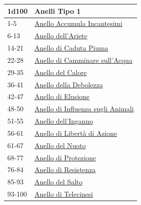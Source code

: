 \begin{multicols}{2}
{{\small\begin{tabular}{ll}
		\toprule
\textbf{1d100} & \textbf{Anelli Tipo 1}\\
\toprule
1-5 & \hyperlink{AnelloAccumulaIncantesimi}{Anello Accumula Incantesimi}\\
6-13& \hyperlink{Anellodell'Ariete}{Anello dell'Ariete}\\
14-21 & \hyperlink{AnellodiCadutaPiuma}{Anello di Caduta Piuma}\\
22-28 & \hyperlink{AnellodiCamminaresull'Acqua}{Anello di Camminare sull'Acqua}\\
29-35 & \hyperlink{AnellodelCalore}{Anello del Calore}\\
36-41 & \hyperlink{AnellodellaDebolezza}{Anello della Debolezza}\\
42-47 & \hyperlink{AnellodiElusione}{Anello di Elusione}\\
48-50 & \hyperlink{AnellodiInfluenzasugliAnimali}{Anello di Influenza sugli Animali}\\
51-55 & \hyperlink{Anellodell'Inganno}{Anello dell'Inganno}\\
56-61 & \hyperlink{AnellodiLibertàdiAzione}{Anello di Libertà di Azione}\\
61-67 & \hyperlink{AnellodelNuoto}{Anello del Nuoto}\\
68-77 & \hyperlink{AnellodiProtezione}{Anello di Protezione}\\
76-84 & \hyperlink{AnellodiResistenza}{Anello di Resistenza}\\
85-93 & \hyperlink{AnellodelSalto}{Anello del Salto}\\
93-100 & \hyperlink{AnellodiTelecinesi}{Anello di Telecinesi}
\end{tabular}}

\medskip\hypertarget{Anello Tipo 2}{}

}
\end{multicols}
